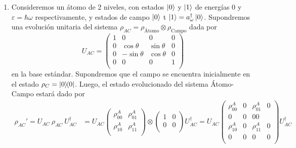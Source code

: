 \documentclass{scrartcl}
\DeclareRobustCommand{\[}{\begin{equation}}
\DeclareRobustCommand{\]}{\end{equation}}
\begin{document}
\begin{enumerate}
\begin{enumerate}[a)]
    \end{enumerate}
    
    
    
    \item Consideremos un átomo de 2 niveles, con estados $\ket{0}$ y $\ket{1}$ de energías $0$ y $\varepsilon = \hbar \omega$ respectivamente, y estados de campo $\ket{0}$ t $\ket{1} = a_{\omega}^\dagger \ket{0}$. Supondremos una evolución unitaria del sistema $\rho_{AC} = \rho_{\text{Átomo}} \otimes \rho_{\text{Campo}}$ dada por
    \[
        U_{AC} =
        \begin{pmatrix}
            1 & 0 & 0 & 0 \\
            0 & \cos\theta & \sin\theta & 0 \\
            0 & -\sin\theta & \cos\theta & 0 \\
            0 & 0 & 0 & 1 \\
        \end{pmatrix}
    \]
    en la base estándar. Supondremos que el campo se encuentra inicialmente en el estado $\rho_C = \dyad{0}{0}$. Luego, el estado evolucionado del sistema Átomo-Campo estará dado por
    \begin{align}
        \rho_{AC}' = U_{AC} \ \rho_{AC} \ U_{AC}^\dagger &= U_{AC}
        \begin{pmatrix}
            \rho^A_{00} & \rho^A_{01} \\
            \rho^A_{10} & \rho^A_{11} \\
        \end{pmatrix}
        \otimes
        \begin{pmatrix}
            1 & 0 \\
            0 & 0 \\
        \end{pmatrix}
        U_{AC}^\dagger
        = U_{AC}
        \begin{pmatrix}
            \rho^A_{00} & 0 & \rho^A_{01} & 0 \\
            0 & 0 & 0 0 \\
            \rho^A_{10} & 0 & \rho^A_{11} & 0 \\
            0 & 0 & 0 & 0 \\
        \end{pmatrix}
        U_{AC}^\dagger \\

\end{align}
\end{enumerate}
\end{document}
